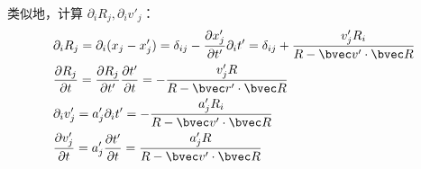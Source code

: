 类似地，计算 $\partial_i R_j,\partial_i v'_j$：
\begin{equation}
\begin{aligned}
&\partial_i R_j=\partial_i(x_j-x_j')=\delta_{ij}-\frac{\partial x_j'}{\partial t'}\partial_i t'=\delta_{ij}+\frac{v'_jR_i}{R-\bvec v'\cdot \bvec R}
\\
&\frac{\partial R_j}{\partial t}=\frac{\partial R_j}{\partial t'}\frac{\partial t'}{\partial t}=-\frac{v'_jR}{R-\bvec r'\cdot \bvec R}
\\
&\partial_i v'_j=a'_j\partial_i t'=-\frac{a'_jR_i}{R-\bvec v'\cdot \bvec R}\\
&\frac{\partial v'_j}{\partial t}=a_j'\frac{\partial t'}{\partial t}=\frac{a_j'R}{R-\bvec v'\cdot \bvec R}
\end{aligned}
\end{equation}
